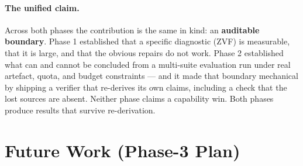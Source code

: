 \paragraph{The unified claim.} Across both phases the contribution is the same in
kind: an \textbf{auditable boundary}. Phase 1 established that a specific
diagnostic (ZVF) is measurable, that it is large, and that the obvious repairs do
not work. Phase 2 established what can and cannot be concluded from a
multi-suite evaluation run under real artefact, quota, and budget constraints ---
and it made that boundary mechanical by shipping a verifier that re-derives its
own claims, including a check that the lost sources are absent. Neither phase
claims a capability win. Both phases produce results that survive re-derivation.

\section{Future Work (Phase-3 Plan)}

